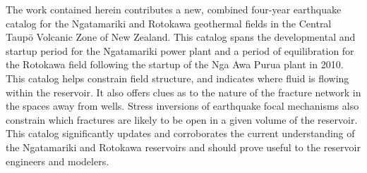 The work contained herein contributes a new, combined four-year earthquake catalog for the Ngatamariki and Rotokawa geothermal fields in the Central Taup\={o} Volcanic Zone of New Zealand. This catalog spans the developmental and startup period for the Ngatamariki power plant and a period of equilibration for the Rotokawa field following the startup of the Nga Awa Purua plant in 2010. This catalog helps constrain field structure, and indicates where fluid is flowing within the reservoir. It also offers clues as to the nature of the fracture network in the spaces away from wells. Stress inversions of earthquake focal mechanisms also constrain which fractures are likely to be open in a given volume of the reservoir. This catalog significantly updates and corroborates the current understanding of the Ngatamariki and Rotokawa reservoirs and should prove useful to the reservoir engineers and modelers.

